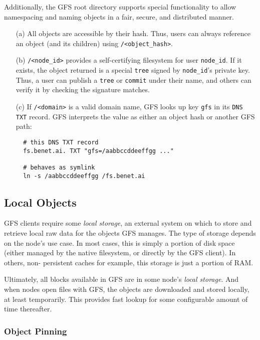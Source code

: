 \documentclass{sig-alternate}
\begin{document}
Additionally, the GFS root directory supports special functionality to
allow namespacing and naming objects in a fair, secure, and distributed
manner.
\begin{itemize}
  \item[(a)] All objects are accessible by their hash. Thus, users can
        always reference an object (and its children) using
        \texttt{/<object\_hash>}.

  \item[(b)] \texttt{/<node\_id>} provides a self-certifying filesystem
        for user \texttt{node\_id}. If it exists, the object returned is a
        special \texttt{tree} signed by \texttt{node\_id}'s private key. Thus,
        a user can publish a \texttt{tree} or \texttt{commit} under their
        name, and others can verify it by checking the signature matches.

  \item[(c)] If \texttt{/<domain>} is a valid domain name, GFS
        looks up key \texttt{gfs} in its \texttt{DNS TXT} record. GFS
        interprets the value as either an object hash or another GFS path:
        \begin{verbatim}
  # this DNS TXT record
  fs.benet.ai. TXT "gfs=/aabbccddeeffgg ..."

  # behaves as symlink
  ln -s /aabbccddeeffgg /fs.benet.ai
        \end{verbatim}

\end{itemize}


\subsection{Local Objects}

GFS clients require some \textit{local storage}, an external system
on which to store and retrieve local raw data for the objects GFS manages.
The type of storage depends on the node's use case.
In most cases, this is simply a portion of disk space (either managed by
the native filesystem, or directly by the GFS client). In others, non-
persistent caches for example, this storage is just a portion of RAM.

Ultimately, all blocks available in GFS are in some node's
\textit{local storage}. And when nodes open files with GFS, the objects are
downloaded and stored locally, at least temporarily. This provides
fast lookup for some configurable amount of time thereafter.

\subsubsection{Object Pinning}
\end{document}
